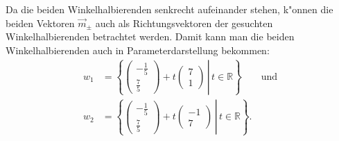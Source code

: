 \begin{loesung}
Da die
beiden Winkelhalbierenden senkrecht aufeinander stehen, k"onnen die beiden
Vektoren $\vec m_{\pm}$ auch als Richtungsvektoren der gesuchten Winkelhalbierenden
betrachtet werden. Damit kann man die beiden Winkelhalbierenden auch in
Parameterdarstellung bekommen:
\begin{align*}
w_1&=\left\{
\left.
\begin{pmatrix}-\frac15\\\frac75\end{pmatrix}+t\begin{pmatrix}7\\1\end{pmatrix}
\,
\right|\,t\in\mathbb R
\right\}\qquad\text{und}
\\
w_2&=\left\{
\left.
\begin{pmatrix}-\frac15\\\frac75\end{pmatrix}+t\begin{pmatrix}-1\\7\end{pmatrix}
\,
\right|\,t\in\mathbb R
\right\}.
\end{align*}
\end{loesung}

